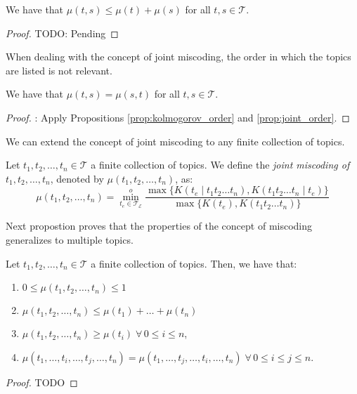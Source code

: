 \begin{proposition}
We have that $\mu(t,s) \leq \mu(t) + \mu(s)$ for all $t, s \in \mathcal{T}$.
\end{proposition}
\begin{proof}
{\color{red} TODO: Pending}
\end{proof}

When dealing with the concept of joint miscoding, the order in which the topics are listed is not relevant.

\begin{proposition}
We have that $\mu(t,s) = \mu(s,t)$ for all $t,s \in \mathcal{T}$.
\end{proposition}
\begin{proof}
{\color{red}: Apply Propositions \ref{prop:kolmogorov_order} and \ref{prop:joint_order}.}
\end{proof}

We can extend the concept of joint miscoding to any finite collection of topics.

\begin{definition}
Let $t_1, t_2, \ldots, t_n \in \mathcal{T}$ a finite collection of topics. We define the \emph{joint miscoding of} $t_1, t_2, \ldots, t_n$, denoted by $\mu(t_1, t_2, \ldots, t_n)$, as:
\[
\mu(t_1, t_2, \ldots, t_n) = \overset{o}{ \underset{t_e \in \mathcal{T}_\mathcal{E}} \min} \frac{ \max\{ K(t_e \mid t_1 t_2 \ldots t_n), K(t_1 t_2 \ldots t_n \mid t_e) \} } { \max\{ K(t_e), K(t_1 t_2 \ldots t_n) \} }
\]
\end{definition}

Next propostion proves that the properties of the concept of miscoding generalizes to multiple topics.

\begin{proposition}
Let $t_1, t_2, \ldots, t_n \in \mathcal{T}$ a finite collection of topics. Then, we have that:

\renewcommand{\theenumi}{\roman{enumi}}
\begin{enumerate}
\item $0 \leq \mu(t_1, t_2, \ldots, t_n) \leq 1$
\item $\mu(t_1, t_2, \ldots, t_n) \leq \mu(t_1) + \ldots + \mu(t_n)$
\item $\mu(t_1, t_2, \ldots, t_n) \geq \mu(t_i) \; \forall \, 0 \leq i \leq n$,
\item $\mu(t_1, \ldots, t_i, \ldots, t_j, \ldots, t_n) = \mu(t_1, \ldots, t_j, \ldots, t_i, \ldots, t_n) \; \forall \, 0 \leq i \leq j \leq n$.
\end{enumerate}
\end{proposition}
\begin{proof}
{\color{red} TODO}
\end{proof}

